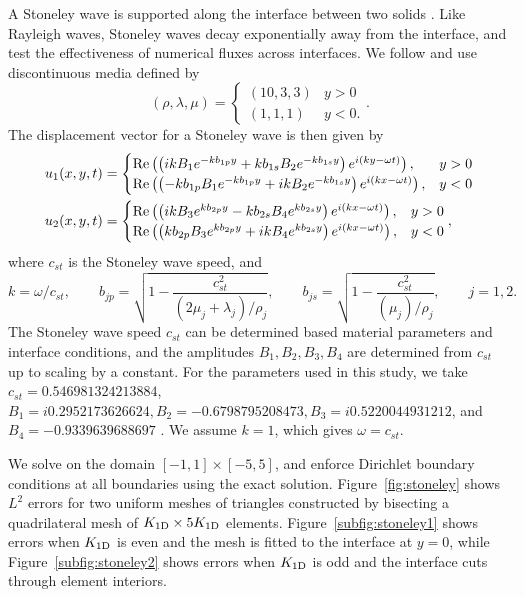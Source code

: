 \documentclass{siamart0216}
\newcommand{\LRp}[1]{\left( #1 \right)}
\begin{document}
A Stoneley wave is supported along the interface between two solids \cite{stoneley1924elastic}.  Like Rayleigh waves, Stoneley waves decay exponentially away from the interface, and test the effectiveness of numerical fluxes across interfaces.  We follow \cite{wilcox2010high,appelo2015energy} and use discontinuous media defined by
\[
(\rho,\lambda,\mu) = \begin{cases}
(10 ,3,3) & y > 0\\
(1,1,1) & y < 0.
\end{cases}.
\]
The displacement vector for a Stoneley wave is then given by
\begin{align*}
u_1(x,y,t) &= \begin{cases}
{\rm Re}\LRp{\LRp{ikB_1e^{-kb_{1p}y} + kb_{1s}B_2 e^{-kb_{1s}y}}e^{i(ky-\omega t)}}, & y > 0\\
{\rm Re}\LRp{\LRp{-k b_{1p}B_1e^{-k b_{1p} y} + i kB_2e^{-kb_{1s}y}}e^{i(kx-\omega t)}}, & y < 0
\end{cases}\\
u_2(x,y,t) &= \begin{cases}
{\rm Re}\LRp{\LRp{ikB_3 e^{k b_{2p} y} - kb_{2s}B_4 e^{k b_{2s}y }} e^{i(kx-\omega t)}}, & y > 0\\
{\rm Re}\LRp{\LRp{k b_{2p} B_3 e^{k b_{2p}y} + ikB_4 e^{k b_{2s}y}}e^{i(kx-\omega t)}}, & y < 0
\end{cases},
\end{align*}
where $c_{st}$ is the Stoneley wave speed, and 
\[
k = \omega/ c_{st}, \qquad b_{jp} = \sqrt{1 - \frac{c_{st}^2}{(2\mu_j + \lambda_j)/\rho_j}}, \qquad  b_{js} = \sqrt{1 - \frac{c_{st}^2}{(\mu_j)/\rho_j}}, \qquad j = 1,2.
\]
The Stoneley wave speed $c_{st}$ can be determined based material parameters and interface conditions, and the amplitudes $B_1,B_2,B_3,B_4$ are determined from $c_{st}$ up to scaling by a constant.  For the parameters used in this study, we take $c_{st} = 0.546981324213884$, $B_1 = i0.2952173626624, B_2 = -0.6798795208473, B_3 = i0.5220044931212$, and $B_4 = -0.9339639688697$ \cite{wilcox2010high}.  We assume $k =1$, which gives $\omega=c_{st}$.  

We solve on the domain $[-1,1]\times [-5,5]$, and enforce Dirichlet boundary conditions at all boundaries using the exact solution.  Figure~\ref{fig:stoneley} shows $L^2$ errors for two uniform meshes of triangles constructed by bisecting a quadrilateral mesh of $K_{\rm 1D} \times 5K_{\rm 1D}$ elements. Figure~\ref{subfig:stoneley1} shows errors when $K_{\rm 1D}$ is even and the mesh is fitted to the interface at $y = 0$, while Figure~\ref{subfig:stoneley2} shows errors when $K_{\rm 1D}$ is odd and the interface cuts through element interiors.  
\end{document}
